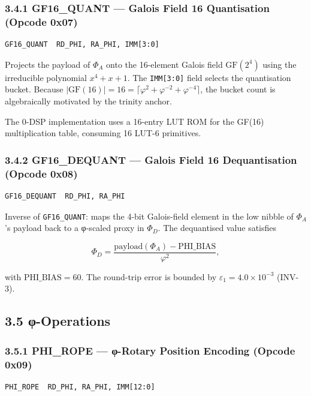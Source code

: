 \subsubsection{3.4.1 GF16\_QUANT --- Galois Field 16 Quantisation (Opcode 0x07)}

\begin{verbatim}
GF16_QUANT  RD_PHI, RA_PHI, IMM[3:0]
\end{verbatim}

Projects the payload of \(\Phi_A\) onto the 16-element Galois
field \(\mathrm{GF}(2^4)\) using the irreducible polynomial
\(x^4 + x + 1\). The \texttt{IMM[3:0]} field selects the
quantisation bucket. Because
\(|\mathrm{GF}(16)| = 16 = \lceil\varphi^2 + \varphi^{-2} + \varphi^{-4}\rceil\),
the bucket count is algebraically motivated by the trinity
anchor.

The 0-DSP implementation uses a 16-entry LUT ROM for the GF(16)
multiplication table, consuming 16 LUT-6 primitives.

\subsubsection{3.4.2 GF16\_DEQUANT --- Galois Field 16 Dequantisation (Opcode 0x08)}

\begin{verbatim}
GF16_DEQUANT  RD_PHI, RA_PHI
\end{verbatim}

Inverse of \texttt{GF16\_QUANT}: maps the 4-bit Galois-field
element in the low nibble of \(\Phi_A\)'s payload back to a
φ-scaled proxy in \(\Phi_D\). The dequantised value satisfies

\[\Phi_D = \frac{\text{payload}(\Phi_A) - \text{PHI\_BIAS}}{\varphi^2},\]

with \(\text{PHI\_BIAS} = 60\). The round-trip error is bounded
by \(\varepsilon_1 = 4.0 \times 10^{-3}\) (INV-3).

\subsection{3.5 φ-Operations}\label{fa_71:phi-operations}

\subsubsection{3.5.1 PHI\_ROPE --- φ-Rotary Position Encoding (Opcode 0x09)}

\begin{verbatim}
PHI_ROPE  RD_PHI, RA_PHI, IMM[12:0]
\end{verbatim}

